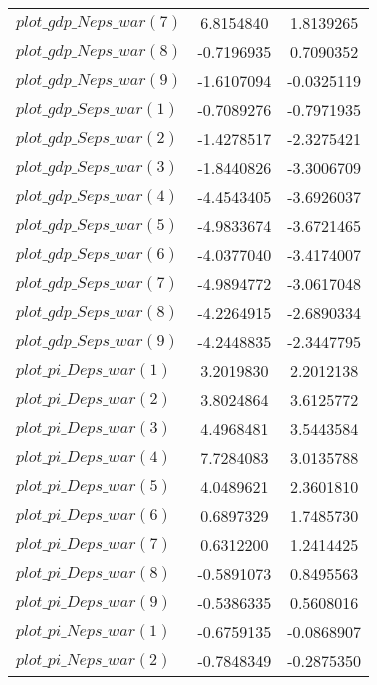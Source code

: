 \begin{center}
\begin{longtable}{lcc}
$plot\_gdp\_N eps\_war (7)  $	 & 	      6.8154840	 & 	      1.8139265 \\ 
$plot\_gdp\_N eps\_war (8)  $	 & 	     -0.7196935	 & 	      0.7090352 \\ 
$plot\_gdp\_N eps\_war (9)  $	 & 	     -1.6107094	 & 	     -0.0325119 \\ 
$plot\_gdp\_S eps\_war (1)  $	 & 	     -0.7089276	 & 	     -0.7971935 \\ 
$plot\_gdp\_S eps\_war (2)  $	 & 	     -1.4278517	 & 	     -2.3275421 \\ 
$plot\_gdp\_S eps\_war (3)  $	 & 	     -1.8440826	 & 	     -3.3006709 \\ 
$plot\_gdp\_S eps\_war (4)  $	 & 	     -4.4543405	 & 	     -3.6926037 \\ 
$plot\_gdp\_S eps\_war (5)  $	 & 	     -4.9833674	 & 	     -3.6721465 \\ 
$plot\_gdp\_S eps\_war (6)  $	 & 	     -4.0377040	 & 	     -3.4174007 \\ 
$plot\_gdp\_S eps\_war (7)  $	 & 	     -4.9894772	 & 	     -3.0617048 \\ 
$plot\_gdp\_S eps\_war (8)  $	 & 	     -4.2264915	 & 	     -2.6890334 \\ 
$plot\_gdp\_S eps\_war (9)  $	 & 	     -4.2448835	 & 	     -2.3447795 \\ 
$plot\_pi\_D eps\_war (1)   $	 & 	      3.2019830	 & 	      2.2012138 \\ 
$plot\_pi\_D eps\_war (2)   $	 & 	      3.8024864	 & 	      3.6125772 \\ 
$plot\_pi\_D eps\_war (3)   $	 & 	      4.4968481	 & 	      3.5443584 \\ 
$plot\_pi\_D eps\_war (4)   $	 & 	      7.7284083	 & 	      3.0135788 \\ 
$plot\_pi\_D eps\_war (5)   $	 & 	      4.0489621	 & 	      2.3601810 \\ 
$plot\_pi\_D eps\_war (6)   $	 & 	      0.6897329	 & 	      1.7485730 \\ 
$plot\_pi\_D eps\_war (7)   $	 & 	      0.6312200	 & 	      1.2414425 \\ 
$plot\_pi\_D eps\_war (8)   $	 & 	     -0.5891073	 & 	      0.8495563 \\ 
$plot\_pi\_D eps\_war (9)   $	 & 	     -0.5386335	 & 	      0.5608016 \\ 
$plot\_pi\_N eps\_war (1)   $	 & 	     -0.6759135	 & 	     -0.0868907 \\ 
$plot\_pi\_N eps\_war (2)   $	 & 	     -0.7848349	 & 	     -0.2875350 \\ 

\end{longtable}
\end{center}
